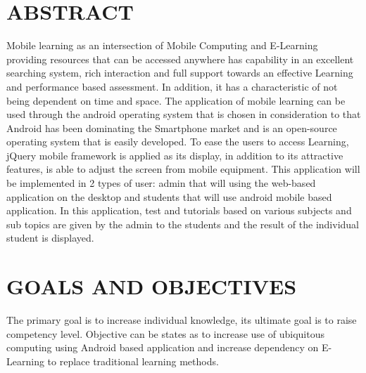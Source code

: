 \documentclass[oneside,a4paper,12pt]{report}
\begin{document}
{\section{ABSTRACT}
\hspace*{0.3in}Mobile learning as an intersection of Mobile Computing and E-Learning providing resources that can be accessed anywhere has capability in an excellent searching
system, rich interaction and full support towards an effective Learning and performance based
assessment. In addition, it has a characteristic of not being dependent on time and space. The application of mobile learning can be used through the android operating system that is chosen in consideration to that Android has been dominating the Smartphone market and is an open-source operating system that is easily developed.
To ease the users to access Learning, jQuery mobile framework is applied as its display, in addition to its attractive features, is able to adjust the screen from mobile equipment. This application will be implemented in 2 types of user: admin that will using the web-based application on the desktop and students that will use android mobile based application. In this application, test and tutorials based on various subjects and sub topics are given by the admin to the students and the result of the individual student is displayed.\\

\section{GOALS AND OBJECTIVES}
\hspace*{0.3in}The primary goal is to increase individual knowledge, its ultimate goal is to raise competency level. Objective can be states as to increase use of ubiquitous computing
using Android based application and increase dependency on E-Learning to replace
traditional learning methods.\\

}
\end{document}
